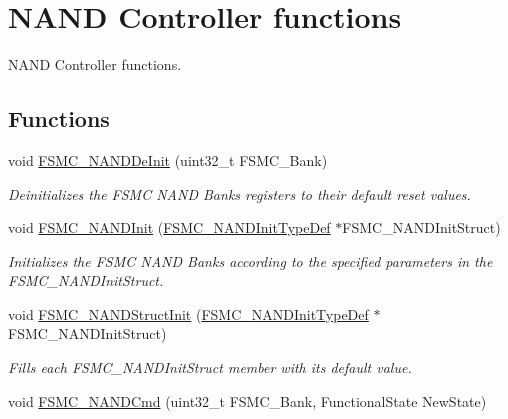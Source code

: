 \hypertarget{group___f_s_m_c___group2}{\section{N\-A\-N\-D Controller functions}
\label{group___f_s_m_c___group2}
}


N\-A\-N\-D Controller functions.  


\subsection*{Functions}
\begin{DoxyCompactItemize}
\item 
void \hyperlink{group___f_s_m_c___group2_gafb749503293474a68555961bd8f120e1}{F\-S\-M\-C\-\_\-\-N\-A\-N\-D\-De\-Init} (uint32\-\_\-t F\-S\-M\-C\-\_\-\-Bank)
\begin{DoxyCompactList}\small\item\em Deinitializes the F\-S\-M\-C N\-A\-N\-D Banks registers to their default reset values. \end{DoxyCompactList}\item 
void \hyperlink{group___f_s_m_c___group2_ga9f81ccc4e126c11f1eb33077b1a68e6f}{F\-S\-M\-C\-\_\-\-N\-A\-N\-D\-Init} (\hyperlink{struct_f_s_m_c___n_a_n_d_init_type_def}{F\-S\-M\-C\-\_\-\-N\-A\-N\-D\-Init\-Type\-Def} $\ast$F\-S\-M\-C\-\_\-\-N\-A\-N\-D\-Init\-Struct)
\begin{DoxyCompactList}\small\item\em Initializes the F\-S\-M\-C N\-A\-N\-D Banks according to the specified parameters in the F\-S\-M\-C\-\_\-\-N\-A\-N\-D\-Init\-Struct. \end{DoxyCompactList}\item 
void \hyperlink{group___f_s_m_c___group2_ga8283ad94ad8e83d49d5b77d1c7e17862}{F\-S\-M\-C\-\_\-\-N\-A\-N\-D\-Struct\-Init} (\hyperlink{struct_f_s_m_c___n_a_n_d_init_type_def}{F\-S\-M\-C\-\_\-\-N\-A\-N\-D\-Init\-Type\-Def} $\ast$F\-S\-M\-C\-\_\-\-N\-A\-N\-D\-Init\-Struct)
\begin{DoxyCompactList}\small\item\em Fills each F\-S\-M\-C\-\_\-\-N\-A\-N\-D\-Init\-Struct member with its default value. \end{DoxyCompactList}\item 
void \hyperlink{group___f_s_m_c___group2_ga33ec7c39ea4d42e92c72c6e517d8235c}{F\-S\-M\-C\-\_\-\-N\-A\-N\-D\-Cmd} (uint32\-\_\-t F\-S\-M\-C\-\_\-\-Bank, Functional\-State New\-State)

\end{DoxyCompactItemize}
